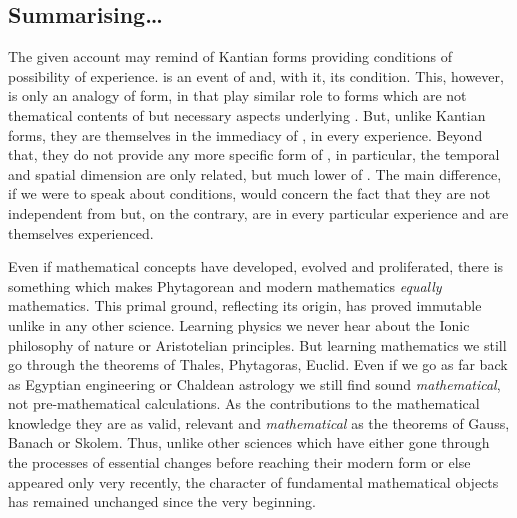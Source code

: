 \subsection{Summarising\ldots} 
 The given account may remind of Kantian  forms
providing conditions of possibility of experience.   is an event
of  and, with it,  its 
condition.  This, however, is only an analogy of form, in that  play similar role to  forms which are not
thematical contents of  but necessary aspects underlying . But, unlike Kantian forms, they are themselves 
in the immediacy of , in every experience.  Beyond
that, they do not provide any more specific form of , in
particular, the temporal and spatial dimension are only related, but much lower
 of .
The main difference, if we were to speak about  conditions, would
concern the fact that they are not independent from  but, on the
contrary, are  in every particular experience and are themselves
experienced. 

Even if mathematical concepts have developed, evolved and proliferated,
there is something which makes Phytagorean and modern mathematics
{\em equally} mathematics.  This primal ground, reflecting its origin, has
proved immutable unlike in any other science.  Learning physics we
never hear about the Ionic philosophy of nature or Aristotelian
principles.  But learning mathematics we still go through the theorems
of Thales, Phytagoras, Euclid.  Even if we go as far back as Egyptian
engineering or Chaldean astrology we still find sound {\em 
mathematical}, not pre-mathematical
calculations.  As the contributions to the mathematical knowledge they
are as valid, relevant and {\em mathematical} as the theorems of
Gauss, Banach or Skolem.  Thus, unlike other sciences which have
either gone through the processes of essential changes before reaching
their modern form or else appeared only very recently, the character
of fundamental mathematical objects has remained unchanged since the
very beginning. 

